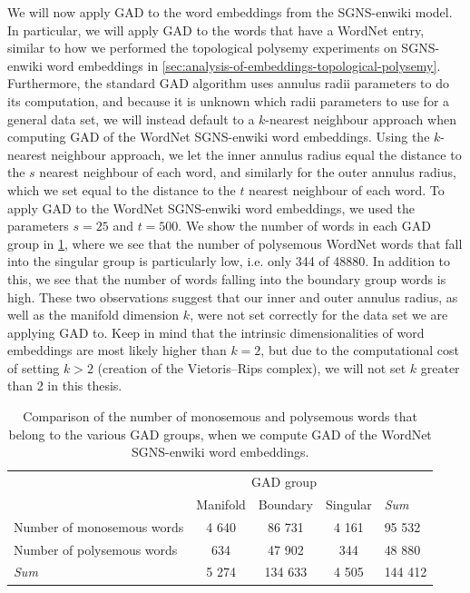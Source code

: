 We will now apply GAD to the word embeddings from the SGNS-enwiki model. In particular, we will apply GAD to the words that have a WordNet entry, similar to how we performed the topological polysemy experiments on SGNS-enwiki word embeddings in \cref{sec:analysis-of-embeddings-topological-polysemy}. Furthermore, the standard GAD algorithm uses annulus radii parameters to do its computation, and because it is unknown which radii parameters to use for a general data set, we will instead default to a $k$-nearest neighbour approach when computing GAD of the WordNet SGNS-enwiki word embeddings. Using the $k$-nearest neighbour approach, we let the inner annulus radius equal the distance to the $s$ nearest neighbour of each word, and similarly for the outer annulus radius, which we set equal to the distance to the $t$ nearest neighbour of each word. To apply GAD to the WordNet SGNS-enwiki word embeddings, we used the parameters $s=25$ and $t=500$. We show the number of words in each GAD group in \cref{table:number-of-words-gad-polysemous-sgns-enwiki-wordnet}, where we see that the number of polysemous WordNet words that fall into the singular group is particularly low, i.e. only 344 of 48880. In addition to this, we see that the number of words falling into the boundary group words is high. These two observations suggest that our inner and outer annulus radius, as well as the manifold dimension $k$, were not set correctly for the data set we are applying GAD to. Keep in mind that the intrinsic dimensionalities of word embeddings are most likely higher than $k=2$, but due to the computational cost of setting $k > 2$ (creation of the Vietoris–Rips complex), we will not set $k$ greater than 2 in this thesis.
\begin{table}[H]
    \centering
    \begin{tabular}{@{}lcccl@{}}
    \toprule
    \multicolumn{1}{c}{}       & \multicolumn{3}{c}{GAD group}  & \multicolumn{1}{l}{} \\ \cmidrule(lr){2-4}
    \multicolumn{1}{c}{}       & Manifold & Boundary & Singular & \textit{Sum}                  \\ \midrule
    \trcolor Number of monosemous words            & 4 640     & 86 731    & 4 161     & 95 532                \\
    Number of polysemous words & 634      & 47 902    & 344      & 48 880                \\ \midrule
    \trcolor \textit{Sum}                        & 5 274     & 134 633   & 4 505     & 144 412 \\ \bottomrule
    \end{tabular}
    \caption{Comparison of the number of monosemous and polysemous words that belong to the various GAD groups, when we compute GAD of the WordNet SGNS-enwiki word embeddings.}
    \label{table:number-of-words-gad-polysemous-sgns-enwiki-wordnet}
\end{table}

